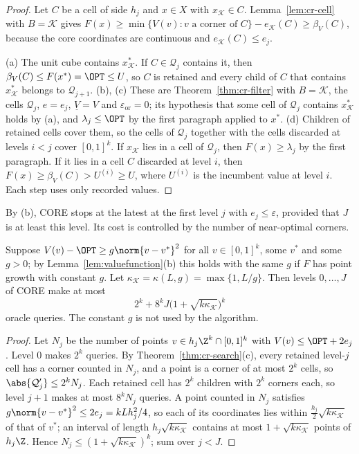\begin{proof}
Let $C$ be a cell of side $h_j$ and $x\in X$ with $x_{\mathcal K}\in C$.
Lemma~\ref{lem:cr-cell} with $B=\mathcal K$ gives
$F(x)\ge\min\{V(v):v\text{ a corner of }C\}-e_{\mathcal K}(C)\ge\beta_V(C)$,
because the core coordinates are continuous and $e_{\mathcal K}(C)\le e_j$.

(a) The unit cube contains $x^*_{\mathcal K}$. If $C\in\mathcal Q_j$ contains
it, then $\beta_V(C)\le F(x^*)=\OPT\le U$, so $C$ is retained and every
child of $C$ that contains $x^*_{\mathcal K}$ belongs to $\mathcal Q_{j+1}$.
(b), (c) These are Theorem~\ref{thm:cr-filter} with $B=\mathcal K$, the
cells $\mathcal Q_j$, $e=e_j$, $\underline V=V$ and $\varepsilon_{\mathrm{or}}=0$; its hypothesis
that some cell of $\mathcal Q_j$ contains $x^*_{\mathcal K}$ holds by (a), and
$\lambda_j\le\OPT$ by the first paragraph applied to $x^*$.
(d) Children of retained cells cover them, so the cells of $\mathcal Q_j$
together with the cells discarded at levels $i<j$ cover $[0,1]^k$. If
$x_{\mathcal K}$ lies in a cell of $\mathcal Q_j$, then $F(x)\ge\lambda_j$ by
the first paragraph. If it lies in a cell $C$ discarded at level $i$, then
$F(x)\ge\beta_V(C)>U^{(i)}\ge U$, where $U^{(i)}$ is the incumbent value at
level $i$. Each step uses only recorded values.
\end{proof}

By (b), CORE stops at the latest at the first level $j$ with
$e_j\le\varepsilon$, provided that $J$ is at least this level. Its cost is
controlled by the number of near-optimal corners.

\begin{proposition}\label{prop:cr-growth}
Suppose $V(v)-\OPT\ge g\norm{v-v^*}^2$ for all $v\in[0,1]^k$, some $v^*$
and some $g>0$; by Lemma~\ref{lem:valuefunction}(b) this holds with the same
$g$ if $F$ has point growth with constant $g$. Let
$\kappa_{\mathcal K}=\kappa(L,g)=\max\{1,L/g\}$. Then levels $0,\dots,J$ of
CORE make at most
\[
2^k+8^kJ\bigl(1+\sqrt{k\kappa_{\mathcal K}}\bigr)^k
\]
oracle queries. The constant $g$ is not used by the algorithm.
\end{proposition}

\begin{proof}
Let $N_j$ be the number of points $v\in h_j\Z^k\cap[0,1]^k$ with
$V(v)\le\OPT+2e_j$. Level $0$ makes $2^k$ queries. By
Theorem~\ref{thm:cr-search}(c), every retained level-$j$ cell has a corner
counted in $N_j$, and a point is a corner of at most $2^k$ cells, so
$\abs{\mathcal Q_j'}\le2^kN_j$. Each retained cell has $2^k$ children with
$2^k$ corners each, so level $j+1$ makes at most $8^kN_j$ queries. A point
counted in $N_j$ satisfies $g\norm{v-v^*}^2\le2e_j=kLh_j^2/4$, so each of
its coordinates lies within $\frac{h_j}2\sqrt{k\kappa_{\mathcal K}}$ of that
of $v^*$; an interval of length $h_j\sqrt{k\kappa_{\mathcal K}}$ contains at
most $1+\sqrt{k\kappa_{\mathcal K}}$ points of $h_j\Z$. Hence
$N_j\le(1+\sqrt{k\kappa_{\mathcal K}})^k$; sum over $j<J$.
\end{proof}

